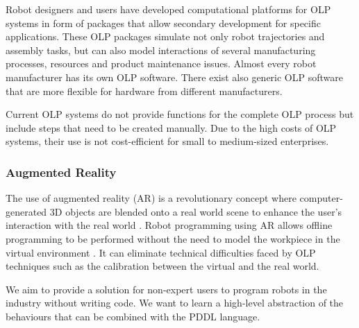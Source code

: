 Robot designers and users have developed computational platforms for OLP systems in form of packages that allow secondary development for specific applications. These OLP packages simulate not only robot trajectories and assembly tasks, but can also model interactions of several manufacturing processes, resources and product maintenance issues. Almost every robot manufacturer has its own OLP software. There exist also generic OLP software that are more flexible for hardware from different manufacturers.

Current OLP systems do not provide functions for the complete OLP process but include steps that need to be created manually. Due to the high costs of OLP systems, their use is not cost-efficient for small to medium-sized enterprises.

\subsubsection{Augmented Reality}\label{sssec:Augmented Reality}
The use of augmented reality (AR) is a revolutionary concept where computer-generated 3D objects are blended onto a real world scene to enhance the user's interaction with the real world \cite{pettersen2003augmented}. Robot programming using AR allows offline programming to be performed without the need to model the workpiece in the virtual environment \cite{pan2012recent}. It can eliminate technical difficulties faced by OLP techniques such as the calibration between the virtual and the real world.

We aim to provide a solution for non-expert users to program robots in the industry without writing code. We want to learn a high-level abstraction of the behaviours that can be combined with the PDDL language.